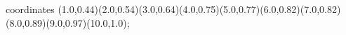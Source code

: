 					coordinates { (1.0,0.44)(2.0,0.54)(3.0,0.64)(4.0,0.75)(5.0,0.77)(6.0,0.82)(7.0,0.82)(8.0,0.89)(9.0,0.97)(10.0,1.0)};